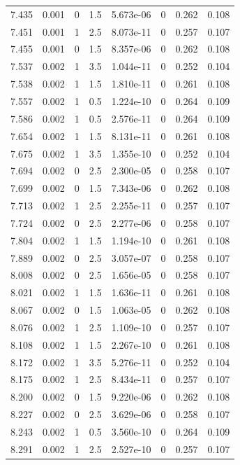 \documentclass[preview]{standalone}
\begin{document}
{{{{{{\begin{tabular}{L{1.2cm}C{1.2cm} C{0.3cm}C{0.5cm} C{1.4cm}C{1.4cm} C{1.4cm}C{1.4cm}}
  7.435  &  0.001  & 0     & 1.5 &  5.673e-06  & 0  & 0.262 &  0.108   \\ 
  7.451  &  0.001  & 1     & 2.5 &  8.073e-11  & 0  & 0.257 &  0.107   \\ 
  7.455  &  0.001  & 0     & 1.5 &  8.357e-06  & 0  & 0.262 &  0.108   \\ 
  7.537  &  0.002  & 1     & 3.5 &  1.044e-11  & 0  & 0.252 &  0.104   \\ 
  7.538  &  0.002  & 1     & 1.5 &  1.810e-11  & 0  & 0.261 &  0.108   \\ 
  7.557  &  0.002  & 1     & 0.5 &  1.224e-10  & 0  & 0.264 &  0.109   \\ 
  7.586  &  0.002  & 1     & 0.5 &  2.576e-11  & 0  & 0.264 &  0.109   \\ 
  7.654  &  0.002  & 1     & 1.5 &  8.131e-11  & 0  & 0.261 &  0.108   \\ 
  7.675  &  0.002  & 1     & 3.5 &  1.355e-10  & 0  & 0.252 &  0.104   \\ 
  7.694  &  0.002  & 0     & 2.5 &  2.300e-05  & 0  & 0.258 &  0.107   \\ 
  7.699  &  0.002  & 0     & 1.5 &  7.343e-06  & 0  & 0.262 &  0.108   \\ 
  7.713  &  0.002  & 1     & 2.5 &  2.255e-11  & 0  & 0.257 &  0.107   \\ 
  7.724  &  0.002  & 0     & 2.5 &  2.277e-06  & 0  & 0.258 &  0.107   \\ 
  7.804  &  0.002  & 1     & 1.5 &  1.194e-10  & 0  & 0.261 &  0.108   \\ 
  7.889  &  0.002  & 0     & 2.5 &  3.057e-07  & 0  & 0.258 &  0.107   \\ 
  8.008  &  0.002  & 0     & 2.5 &  1.656e-05  & 0  & 0.258 &  0.107   \\ 
  8.021  &  0.002  & 1     & 1.5 &  1.636e-11  & 0  & 0.261 &  0.108   \\ 
  8.067  &  0.002  & 0     & 1.5 &  1.063e-05  & 0  & 0.262 &  0.108   \\ 
  8.076  &  0.002  & 1     & 2.5 &  1.109e-10  & 0  & 0.257 &  0.107   \\ 
  8.108  &  0.002  & 1     & 1.5 &  2.267e-10  & 0  & 0.261 &  0.108   \\ 
  8.172  &  0.002  & 1     & 3.5 &  5.276e-11  & 0  & 0.252 &  0.104   \\ 
  8.175  &  0.002  & 1     & 2.5 &  8.434e-11  & 0  & 0.257 &  0.107   \\ 
  8.200  &  0.002  & 0     & 1.5 &  9.220e-06  & 0  & 0.262 &  0.108   \\ 
  8.227  &  0.002  & 0     & 2.5 &  3.629e-06  & 0  & 0.258 &  0.107   \\ 
  8.243  &  0.002  & 1     & 0.5 &  3.560e-10  & 0  & 0.264 &  0.109   \\ 
  8.291  &  0.002  & 1     & 2.5 &  2.527e-10  & 0  & 0.257 &  0.107   \\ 
\hline 
\end{tabular} 

}}}}}}
\end{document}
